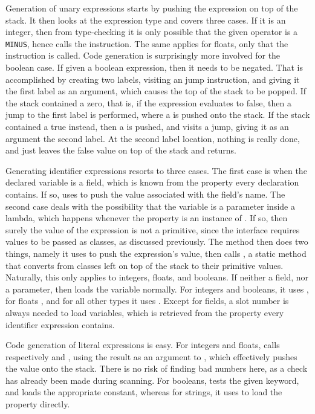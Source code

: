 Generation of unary expressions starts by pushing the expression on top of the stack. It then looks at the expression type and covers three cases. If it is an integer, then from type-checking it is only possible that the given operator is a \texttt{MINUS}, hence  calls the  instruction. The same applies for floats, only that the  instruction is called. Code generation is surprisingly more involved for the boolean case. If given a boolean expression, then it needs to be negated. That is accomplished by creating two labels, visiting an  jump instruction, and giving it the first label as an argument, which causes the top of the stack to be popped. If the stack contained a zero, that is, if the expression evaluates to false, then a jump to the first label is performed, where a  is pushed onto the stack. If the stack contained a true instead, then a  is pushed, and  visits a  jump, giving it as an argument the second label. At the second label location, nothing is really done, and  just leaves the false value on top of the stack and returns.

Generating identifier expressions resorts to three cases. The first case is when the declared variable is a field, which is known from the  property every declaration contains. If so,  uses  to push the value associated with the field's name. The second case deals with the possibility that the variable is a parameter inside a lambda, which happens whenever the  property is an instance of . If so, then surely the value of the expression is not a primitive, since the  interface requires values to be passed as classes, as discussed previously. The  method then does two things, namely it uses  to push the expression's value, then calls , a static method that converts from classes left on top of the stack to their primitive values. Naturally, this only applies to integers, floats, and booleans. If neither a field, nor a parameter, then  loads the variable normally. For integers and booleans, it uses , for floats , and for all other types it uses . Except for fields, a slot number is always needed to load variables, which is retrieved from the  property every identifier expression contains.

Code generation of literal expressions is easy. For integers and floats,  calls respectively  and , using the result as an argument to , which effectively pushes the value onto the stack. There is no risk of finding bad numbers here, as a check has already been made during scanning. For booleans,  tests the given keyword, and loads the appropriate constant, whereas for strings, it uses  to load the  property directly.

